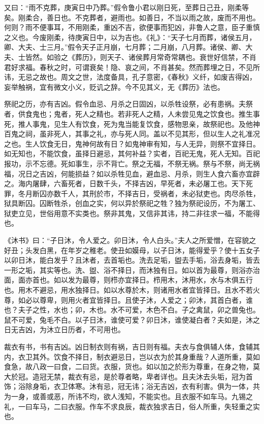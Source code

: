 \documentclass[]{article}
\begin{document}
又曰：``雨不克葬，庚寅日中乃葬。''假令鲁小君以刚日死，至葬日己丑，刚柔等矣。刚柔合，善日也。不克葬者，避雨也。如善日，不当以雨之故，废而不用也。何则？雨不便事耳，不用刚柔，重凶不吉，欲便事而犯凶，非鲁人之意，臣子重慎之义也。今废刚柔，待庚寅日中，以为吉也。《礼》：``天子七月而葬，诸侯五月，卿、大夫、士三月。''假令天子正月崩，七月葬；二月崩，八月葬。诸侯、卿、大夫、士皆然。如验之《葬历》，则天子、诸侯葬月常奇常耦也。衰世好信禁，不肖君好求福。春秋之时，可谓衰矣！隐、哀之间，不肖甚矣。然而葬埋之日，不见所讳，无忌之故也。周文之世，法度备具，孔子意密，《春秋》义纤，如废吉得凶，妄举触祸，宜有微文小义，贬讥之辞。今不见其义，无《葬历》法也。

祭祀之历，亦有吉凶。假令血忌、月杀之日固凶，以杀牲设祭，必有患祸。夫祭者，供食鬼也；鬼者，死人之精也。若非死人之精，人未尝见鬼之饮食也。推生事死，推人事鬼，见生人有饮食，死为鬼当能复饮食，感物思亲，故祭祀也。及他神百鬼之祠，虽非死人，其事之礼，亦与死人同。盖以不见其形，但以生人之礼准况之也。生人饮食无日，鬼神何故有日？如鬼神审有知，与人无异，则祭不宜择日。如无知也，不能饮食，虽择日避忌，其何补益？实者，百祀无鬼，死人无知。百祀报功，示不忘德。死如事生，示不背亡。祭之无福，不祭无祸。祭与不祭，尚无祸福，况日之吉凶，何能损益？如以杀牲见血，避血忌、月杀，则生人食六畜亦宜辟之。海内屠肆，六畜死者，日数千头，不择吉凶，早死者，未必屠工也。天下死罪，冬月断囚亦数千人，其刑於市，不择吉日，受祸者，未必狱吏也。肉尽杀牲，狱具断囚。囚断牲杀，创血之实，何以异於祭祀之牲？独为祭祀设历，不为屠工、狱吏立见，世俗用意不实类也。祭非其鬼，又信非其讳，持二非往求一福，不能得也。

《沐书》曰：``子日沐，令人爱之。卯日沐，令人白头。''夫人之所爱憎，在容貌之好丑；头发白黑，在年岁之稚老。使丑如嫫母，以子日沐，能得爱乎？使十五女子以卯日沐，能白发乎？且沐者，去首垢也。洗去足垢，盥去手垢，浴去身垢，皆去一形之垢，其实等也。洗、盥、浴不择日，而沐独有日。如以首为最尊，则浴亦治面，面亦首也。如以发为最尊，则栉亦宜择日。栉用木，沐用水，水与木俱五行也。用木不避忌，用水独择日。如以水尊於木，则诸用水者宜皆择日。且水不若火尊，如必以尊卑，则用火者宜皆择日。且使子沐，人爱之；卯沐，其首白者，谁也？夫子之性，水也；卯，木也。水不可爱，木色不白。子之禽鼠，卯之兽兔也。鼠不可爱，兔毛不白。以子日沐，谁使可爱？卯日沐，谁使凝白者？夫如是，沐之日无吉凶，为沐立日历者，不可用也。

裁衣有书，书有吉凶。凶日制衣则有祸，吉日则有福。夫衣与食俱辅人体，食辅其内，衣卫其外。饮食不择日，制衣避忌日，岂以衣为於其身重哉？人道所重，莫如食急，故八政一曰食，二曰货。衣服，货也。如以加之於形为尊重，在身之物，莫大於冠。造冠无禁，裁衣有忌，是於尊者略，卑者详也。且夫沐去头垢，冠为首饰；浴除身垢，衣卫体寒。沐有忌，冠无讳；浴无吉凶，衣有利害。俱为一体，共为一身，或善或恶，所讳不均，欲人浅知，不能实也。且衣服不如车马。九锡之礼，一曰车马，二曰衣服。作车不求良辰，裁衣独求吉日，俗人所重，失轻重之实也。
\end{document}
